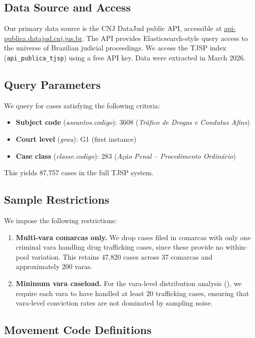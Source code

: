\documentclass[12pt]{article}
\begin{document}
\subsection{Data Source and Access}

Our primary data source is the CNJ DataJud public API, accessible at \url{api-publica.datajud.cnj.jus.br}. The API provides Elasticsearch-style query access to the universe of Brazilian judicial proceedings. We access the TJSP index (\texttt{api\_publica\_tjsp}) using a free API key. Data were extracted in March 2026.

\subsection{Query Parameters}

We query for cases satisfying the following criteria:
\begin{itemize}
\item \textbf{Subject code} (\textit{assuntos.codigo}): 3608 (\textit{Tr\'afico de Drogas e Condutas Afins})
\item \textbf{Court level} (\textit{grau}): G1 (first instance)
\item \textbf{Case class} (\textit{classe.codigo}): 283 (\textit{A\c{c}\~ao Penal -- Procedimento Ordin\'ario})
\end{itemize}

This yields 87,757 cases in the full TJSP system.

\subsection{Sample Restrictions}

We impose the following restrictions:
\begin{enumerate}
\item \textbf{Multi-vara comarcas only.} We drop cases filed in comarcas with only one criminal vara handling drug trafficking cases, since these provide no within-pool variation. This retains 47,820 cases across 37 comarcas and approximately 200 varas.
\item \textbf{Minimum vara caseload.} For the vara-level distribution analysis (), we require each vara to have handled at least 20 trafficking cases, ensuring that vara-level conviction rates are not dominated by sampling noise.
\end{enumerate}

\subsection{Movement Code Definitions}
\end{document}
